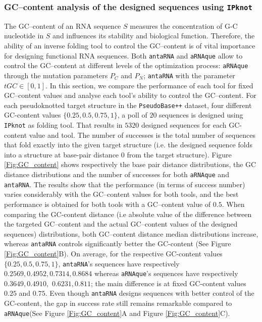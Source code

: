 \subsubsection{GC--content analysis of the designed sequences using \texttt{IPknot}}
The GC--content of an RNA sequence $S$ measures the concentration of G-C nucleotide in $S$ and influences its stability and biological function. Therefore, the ability of an inverse folding tool to control the GC--content is of vital importance for designing functional RNA sequences. Both \texttt{antaRNA} and \texttt{aRNAque} allow to control the GC--content at different levels of the optimization process: \texttt{aRNAque} through the mutation parameters $P_C$ and $P_N$; \texttt{antaRNA} with the parameter $tGC\in [ 0,1 ]$. In this section, we compare the performance of each tool for fixed GC--content values and analyse each tool's ability to control the GC--content. For each pseudoknotted target structure in the \texttt{PseudoBase++} dataset, four different GC-content values $\{0.25,0.5, 0.75, 1\}$, a poll of $20$ sequences is designed using \texttt{IPknot} as folding tool. That results in $5320$ designed sequences for each GC-content value and tool. The number of successes is the total number of sequences that fold exactly into the given target structure (i.e. the designed sequence folds into a structure at base-pair distance $0$ from the target structure). Figure \ref{Fig:GC_content} shows respectively the base pair distance distributions, the GC distance distributions and the number of successes for both \texttt{aRNAque} and \texttt{antaRNA}. The results show that the performance (in terms of success number) varies considerably with the GC--content values for both tools, and the best performance is obtained for both tools with a GC--content value of $0.5$. When comparing the GC-content distance (i.e absolute value of the difference between the targeted GC--content and the actual GC--content values of the designed sequences) distributions, both GC--content distance median distributions increase, whereas \texttt{antaRNA} controls significantly better the GC-content (See Figure \ref{Fig:GC_content}B). On average, for the respective GC-content values $\{0.25, 0.5, 0.75, 1\}$, \texttt{antaRNA}'s sequences have respectively $0.2569, 0.4952, 0.7314, 0.8684$ whereas  \texttt{aRNAque}'s sequences have respectively $0.3649, 0.4910,$ $ 0.6231, 0.811$; the main difference is at fixed GC-content values $0.25$ and $0.75$. Even though \texttt{antaRNA} designs sequences with better control of the GC-content, the gap in success rate still remains remarkable compared to \texttt{aRNAque}(See Figure \ref{Fig:GC_content}A and Figure \ref{Fig:GC_content}C).
